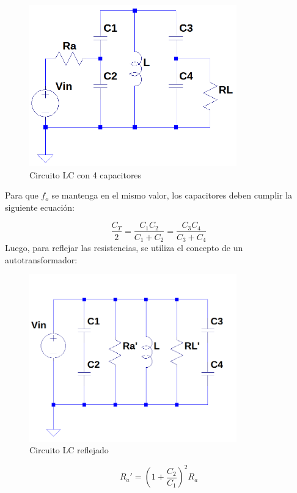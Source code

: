 \begin{figure}[!h]
    \centering
    \includegraphics[width=0.8\textwidth]{Imagenes/LC_2.png}
    \caption{Circuito LC con 4 capacitores}
    \label{fig:LC_2}
\end{figure}

Para que \( f_o \) se mantenga en el mismo valor, los capacitores deben cumplir la siguiente ecuación:  

\begin{equation}
    \frac{C_T}{2} = \frac{C_1C_2}{C_1+C_2} = \frac{C_3C_4}{C_3+C_4}
\end{equation}
Luego, para reflejar las resistencias, se utiliza el concepto de un autotransformador:
\begin{figure}[!h]
    \centering
    \includegraphics[width=0.8\textwidth]{Imagenes/LC_3.png}
    \caption{Circuito LC reflejado}
    \label{fig:LC_3}
\end{figure}
\begin{equation}
    R_a' = (1+\frac{C_2}{C_1})^2R_a
\end{equation}

